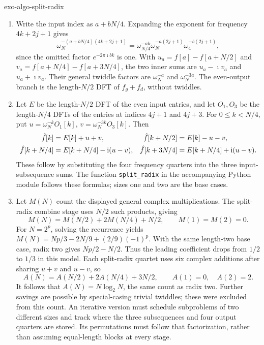 \begin{correction}{exo-algo-split-radix}
\begin{enumerate}
\item Write the input index as $a+bN/4$. Expanding the exponent for
frequency $4k+2j+1$ gives
\[
 \omega_N^{-(a+bN/4)(4k+2j+1)}
 =\omega_{N/4}^{-ak}\omega_N^{-a(2j+1)}\omega_4^{-b(2j+1)},
\]
since the omitted factor $e^{-2\pi\imath bk}$ is one.
With $u_a=f[a]-f[a+N/2]$ and $v_a=f[a+N/4]-f[a+3N/4]$, the two inner
sums are $u_a-\imath v_a$ and $u_a+\imath v_a$.
Their general twiddle factors are $\omega_N^{-a}$ and $\omega_N^{-3a}$.
The even-output branch is the length-$N/2$ DFT of $f_g+f_d$, without twiddles.
\item Let $E$ be the length-$N/2$ DFT of the even input entries, and let
$O_1,O_3$ be the length-$N/4$ DFTs of the entries at indices $4j+1$ and
$4j+3$. For $0\leq k<N/4$, put
$u=\omega_N^{-k}O_1[k]$, $v=\omega_N^{-3k}O_3[k]$.
Then
\begin{align*}
 \hat{f}[k]&=E[k]+u+v,&
 \hat{f}[k+N/2]&=E[k]-u-v,\\
 \hat{f}[k+N/4]&=E[k+N/4]-\mathrm{i}(u-v),&
 \hat{f}[k+3N/4]&=E[k+N/4]+\mathrm{i}(u-v).
\end{align*}
These follow by substituting the four frequency quarters into the three
input-subsequence sums. The function \texttt{split\_radix} in the accompanying
Python module follows these formulas; sizes one and two are the base cases.
\item Let $M(N)$ count the displayed general complex multiplications.
The split-radix combine stage uses $N/2$ such products, giving
\[
 M(N)=M(N/2)+2M(N/4)+N/2,\qquad M(1)=M(2)=0.
\]
For $N=2^p$, solving the recurrence yields
$M(N)=Np/3-2N/9+(2/9)(-1)^p$.
With the same length-two base case, radix two gives $Np/2-N/2$.
Thus the leading coefficient drops from $1/2$ to $1/3$ in this model.
Each split-radix quartet uses six complex additions after sharing $u+v$
and $u-v$, so
\[
 A(N)=A(N/2)+2A(N/4)+3N/2,\qquad A(1)=0,\quad A(2)=2.
\]
It follows that $A(N)=N\log_2N$, the same count as radix two.
Further savings are possible by special-casing trivial twiddles; these were
excluded from this count. An iterative version must schedule subproblems of
two different sizes and track where the three subsequences and four output
quarters are stored. Its permutations must follow that factorization, rather
than assuming equal-length blocks at every stage.
\end{enumerate}
\end{correction}

